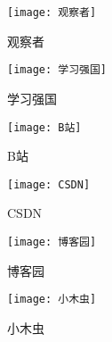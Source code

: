 \documentclass{article}
\begin{document}
\begin{figure}[H]
\centering
\texttt{[image: 观察者]}
\caption{观察者}
\label{fig:universe}
\end{figure}

\begin{figure}[H]
\centering
\texttt{[image: 学习强国]}
\caption{学习强国}
\label{fig:universe}
\end{figure}

\begin{figure}[H]
\centering
\texttt{[image: B站]}
\caption{B站}
\label{fig:universe}
\end{figure}

\begin{figure}[H]
\centering
\texttt{[image: CSDN]}
\caption{CSDN}
\label{fig:universe}
\end{figure}

\begin{figure}[H]
\centering
\texttt{[image: 博客园]}
\caption{博客园}
\label{fig:universe}
\end{figure}

\begin{figure}[H]
\centering
\texttt{[image: 小木虫]}
\caption{小木虫}
\label{fig:universe}
\end{figure}


\hspace*{\fill} \\




\end{document}
